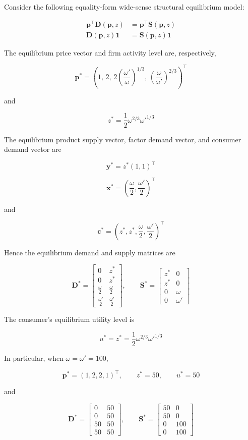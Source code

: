\documentclass[
  letterpaper,
  DIV=11,
  numbers=noendperiod]{scrreprt}
\begin{document}
Consider the following equality-form wide-sense structural equilibrium
model:

\[
\begin{aligned}
\mathbf p^\top\mathbf D(\mathbf p,z)
&=\mathbf p^\top\mathbf S(\mathbf p,z)\\
\mathbf D(\mathbf p,z)\mathbf1
&=\mathbf S(\mathbf p,z)\mathbf1
\end{aligned}
\]

The equilibrium price vector and firm activity level are, respectively,

\[
\mathbf p^*
=
\left(
1,\,
2,\,
2\left(\frac{\omega'}{\omega}\right)^{1/3},\,
\left(\frac{\omega}{\omega'}\right)^{2/3}
\right)^\top
\]

and

\[
z^*
=
\frac12\omega^{2/3}{\omega'}^{1/3}
\]

The equilibrium product supply vector, factor demand vector, and
consumer demand vector are

\[
\mathbf y^*
=
z^*(1,1)^\top
\]

\[
\mathbf x^*
=
\left(
\frac{\omega}{2},
\frac{\omega'}{2}
\right)^\top
\]

and

\[
\mathbf c^*
=
\left(
z^*,
z^*,
\frac{\omega}{2},
\frac{\omega'}{2}
\right)^\top
\]

Hence the equilibrium demand and supply matrices are

\[
\mathbf D^*
=
\begin{bmatrix}
0&z^*\\
0&z^*\\
\frac{\omega}{2}&\frac{\omega}{2}\\
\frac{\omega'}{2}&\frac{\omega'}{2}
\end{bmatrix},
\qquad
\mathbf S^*
=
\begin{bmatrix}
z^*&0\\
z^*&0\\
0&\omega\\
0&\omega'
\end{bmatrix}
\]

The consumer's equilibrium utility level is

\[
u^*=z^*
=
\frac12\omega^{2/3}{\omega'}^{1/3}
\]

In particular, when \(\omega=\omega'=100\),

\[
\mathbf p^*=(1,2,2,1)^\top,\qquad
z^*=50,\qquad
u^*=50
\]

and

\[
\mathbf D^*
=
\begin{bmatrix}
0&50\\
0&50\\
50&50\\
50&50
\end{bmatrix},
\qquad
\mathbf S^*
=
\begin{bmatrix}
50&0\\
50&0\\
0&100\\
0&100
\end{bmatrix}
\]
\end{document}
